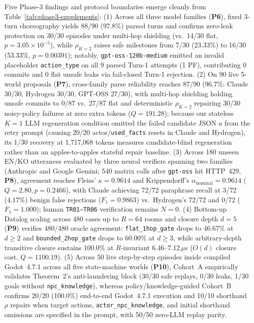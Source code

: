 Five Phase-3 findings and protocol boundaries emerge cleanly from Table~\ref{tab:phase3-supplements}:
(1) Across all three model families (\textbf{P6}), fixed 3-turn choreography yields 88/90 (97.8\%) parsed turns and confirms zero-leak protection on 30/30 episodes under multi-hop shielding (vs.\ 14/30 flat, $p{=}3.05{\times}10^{-5}$), while $\rho_{K=2}$ raises safe milestones from 7/30 (23.33\%) to 16/30 (53.33\%, $p{=}0.00391$); notably, \texttt{gpt-oss-120b-medium} emitted an invalid placeholder \texttt{action\_type} on all 9 parsed Turn-1 attempts (1 PF), contributing 0 commits and 0 flat unsafe leaks via fail-closed Turn-1 rejection.
(2) On 90 live 5-world proposals (\textbf{P7}), cross-family parse reliability reaches 87/90 (96.7\%: Claude 30/30, Hydrogen 30/30, GPT-OSS 27/30), with multi-hop shielding holding unsafe commits to 0/87 vs.\ 27/87 flat and deterministic $\rho_{K=2}$ repairing 30/30 noisy-policy failures at zero extra tokens ($Q{=}191.28$); because our stateless $K{=}1$ LLM regeneration condition omitted the failed candidate JSON $a$ from the retry prompt (causing 20/20 actor/\texttt{used\_facts} resets in Claude and Hydrogen), its 1/30 recovery at 1,717,068 tokens measures candidate-blind regeneration rather than an apples-to-apples stateful repair baseline.
(3) Across 180 unseen EN/KO utterances evaluated by three neural verifiers spanning two families (Anthropic and Google Gemini; 540 matrix calls after \texttt{gpt-oss} hit HTTP~429, \textbf{P8}), agreement reaches Fleiss' $\kappa{=}0.9614$ and Krippendorff's $\alpha_{\mathrm{nominal}}{=}0.9614$ ($Q{=}2.80, p{=}0.2466$), with Claude achieving 72/72 paraphrase recall at 3/72 (4.17\%) benign false rejections ($F_1{=}0.9863$) vs.\ Hydrogen's 72/72 and 0/72 ($F_1{=}1.000$); human \texttt{TR01--TR06} verification remains $N{=}0$.
(4) Bottom-up Datalog scaling across 480 cases up to $R{=}64$ rooms and closure depth $d{=}5$ (\textbf{P9}) verifies 480/480 oracle agreement: \texttt{flat\_}\allowbreak\texttt{1hop\_}\allowbreak\texttt{gate} drops to 46.67\% at $d{\ge}2$ and \texttt{bounded\_}\allowbreak\texttt{2hop\_}\allowbreak\texttt{gate} drops to 60.00\% at $d{\ge}3$, while arbitrary-depth transitive closure sustains 100.0\% at $R$-invariant 6.46--7.12\,$\mu$s ($O(d)$ closure cost, $Q{=}1100.19$).
(5) Across 50 live step-by-step episodes inside compiled Godot~4.7.1 across all five state-machine worlds (\textbf{P10}), Cohort~A empirically validates Theorem~2's anti-laundering block (30/30 safe replays, 0/30 leaks, 1/30 goals without \texttt{npc\_knowledge}), whereas policy/knowledge-guided Cohort~B confirms 20/20 (100.0\%) end-to-end Godot~4.7.1 execution and 10/10 shorthand $\rho$ repairs when target actions, \texttt{actor\_npc\_knowledge}, and initial shorthand omissions are specified in the prompt, with 50/50 zero-LLM replay parity.
